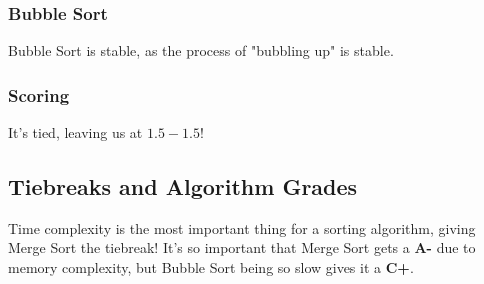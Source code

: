 \documentclass{article}
\begin{document}
\subsubsection{Bubble Sort}
Bubble Sort is stable, as the process of "bubbling up" is stable.
\subsubsection{Scoring}
It's tied, leaving us at $1.5 - 1.5$!
\subsection{Tiebreaks and Algorithm Grades}
Time complexity is the most important thing for a sorting algorithm, 
giving Merge Sort the tiebreak! It's so important that Merge Sort gets 
a \textbf{A-} due to memory complexity, but Bubble Sort being so slow 
gives it a \textbf{C+}. 
\end{document}
